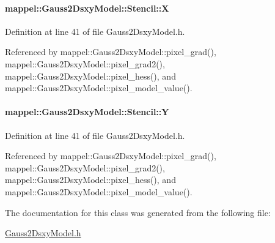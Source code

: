 \paragraph[{\texorpdfstring{X}{X}}]{ mappel\+::\+Gauss2\+Dsxy\+Model\+::\+Stencil\+::X}\hypertarget{classmappel_1_1Gauss2DsxyModel_1_1Stencil_aaae6167bf4700849c8a8d5094c07759e}{}\label{classmappel_1_1Gauss2DsxyModel_1_1Stencil_aaae6167bf4700849c8a8d5094c07759e}


Definition at line 41 of file Gauss2\+Dsxy\+Model.\+h.



Referenced by mappel\+::\+Gauss2\+Dsxy\+Model\+::pixel\+\_\+grad(), mappel\+::\+Gauss2\+Dsxy\+Model\+::pixel\+\_\+grad2(), mappel\+::\+Gauss2\+Dsxy\+Model\+::pixel\+\_\+hess(), and mappel\+::\+Gauss2\+Dsxy\+Model\+::pixel\+\_\+model\+\_\+value().

\paragraph[{\texorpdfstring{Y}{Y}}]{ mappel\+::\+Gauss2\+Dsxy\+Model\+::\+Stencil\+::Y}\hypertarget{classmappel_1_1Gauss2DsxyModel_1_1Stencil_a7ae9cae8a1322fa1c16c7753fb8586ea}{}\label{classmappel_1_1Gauss2DsxyModel_1_1Stencil_a7ae9cae8a1322fa1c16c7753fb8586ea}


Definition at line 41 of file Gauss2\+Dsxy\+Model.\+h.



Referenced by mappel\+::\+Gauss2\+Dsxy\+Model\+::pixel\+\_\+grad(), mappel\+::\+Gauss2\+Dsxy\+Model\+::pixel\+\_\+grad2(), mappel\+::\+Gauss2\+Dsxy\+Model\+::pixel\+\_\+hess(), and mappel\+::\+Gauss2\+Dsxy\+Model\+::pixel\+\_\+model\+\_\+value().



The documentation for this class was generated from the following file\+:\begin{DoxyCompactItemize}
\item 
\hyperlink{Gauss2DsxyModel_8h}{Gauss2\+Dsxy\+Model.\+h}\end{DoxyCompactItemize}
